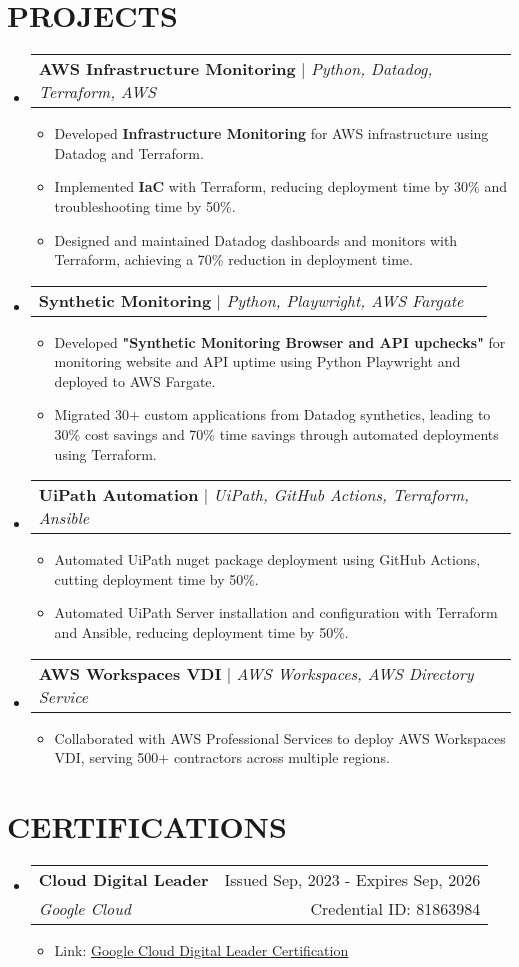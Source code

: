 \documentclass[letterpaper,11pt]{article}
\makeatletter
\newcommand{\resumeItem}[1]{
  \item\small{
    {#1 \vspace{-1pt}}
  }
}
\newcommand{\resumeSubheading}[4]{
  \vspace{-1pt}\item
    \begin{tabular*}{\textwidth}[t]{l@{\extracolsep{\fill}}r}
      \textbf{#1} & {\color{dark-grey}\small #2}\vspace{1pt}\\ %
      \textit{#3} & {\color{dark-grey} \small #4}\\ %
    \end{tabular*}\vspace{-4pt}
}
\newcommand{\resumeProjectHeading}[2]{
    \item
    \begin{tabular*}{\textwidth}{l@{\extracolsep{\fill}}r}
      #1 & {\color{dark-grey}} \\
    \end{tabular*}\vspace{-4pt}
}
\newcommand{\resumeSubHeadingListStart}{\begin{itemize}[leftmargin=0in, label={}]}
\newcommand{\resumeSubHeadingListEnd}{\end{itemize}}
\newcommand{\resumeItemListStart}{\begin{itemize}}
\newcommand{\resumeItemListEnd}{\end{itemize}\vspace{0pt}}
\makeatother
\begin{document}
\section {PROJECTS}
    \resumeSubHeadingListStart
      \resumeProjectHeading
          {\textbf{AWS Infrastructure Monitoring} $|$ \emph{Python, Datadog, Terraform, AWS}}{Dec 2020 -- Present}
          \resumeItemListStart
            \resumeItem{Developed \textbf{Infrastructure Monitoring} for AWS infrastructure using Datadog and Terraform.}
            \resumeItem{Implemented \textbf{IaC} with Terraform, reducing deployment time by 30\% and troubleshooting time by 50\%.}
            \resumeItem{Designed and maintained Datadog dashboards and monitors with Terraform, achieving a 70\% reduction in deployment time.}
          \resumeItemListEnd
      \resumeProjectHeading
          {\textbf{Synthetic Monitoring} $|$ \emph{Python, Playwright, AWS Fargate}}{Dec 2020 -- Present}
          \resumeItemListStart
            \resumeItem{Developed \textbf{"Synthetic Monitoring Browser and API upchecks"} for monitoring website and API uptime using Python Playwright and deployed to AWS Fargate.}
            \resumeItem{Migrated 30+ custom applications from Datadog synthetics, leading to 30\% cost savings and 70\% time savings through automated deployments using Terraform.}
          \resumeItemListEnd
      \resumeProjectHeading
          {\textbf{UiPath Automation} $|$ \emph{UiPath, GitHub Actions, Terraform, Ansible}}{Dec 2020 -- Present}
          \resumeItemListStart
            \resumeItem{Automated UiPath nuget package deployment using GitHub Actions, cutting deployment time by 50\%.}
            \resumeItem{Automated UiPath Server installation and configuration with Terraform and Ansible, reducing deployment time by 50\%.}
          \resumeItemListEnd
      \resumeProjectHeading
          {\textbf{AWS Workspaces VDI} $|$ \emph{AWS Workspaces, AWS Directory Service}}{Dec 2020 -- Present}
          \resumeItemListStart
            \resumeItem{Collaborated with AWS Professional Services to deploy AWS Workspaces VDI, serving 500+ contractors across multiple regions.}
          \resumeItemListEnd
    \resumeSubHeadingListEnd

\section{CERTIFICATIONS}
  \resumeSubHeadingListStart

    \resumeSubheading
      {Cloud Digital Leader}{Issued Sep, 2023 - Expires Sep, 2026}
      {Google Cloud}{Credential ID: 81863984}
      \resumeItemListStart
        \resumeItem{Link: \href{https://www.credential.net/ac8b2017-57db-4e03-a908-fbdf5af86321}{\underline{Google Cloud Digital Leader Certification}}}
      \resumeItemListEnd
  \resumeSubHeadingListEnd
  
\end{document}
